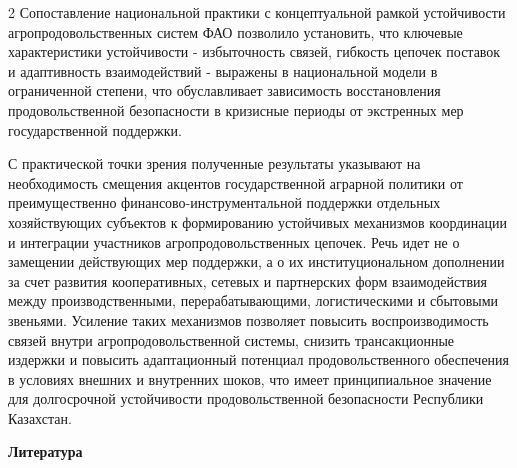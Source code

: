 \begin{multicols}{2}
Сопоставление национальной практики с концептуальной рамкой устойчивости
агропродовольственных систем ФАО позволило установить, что ключевые
характеристики устойчивости - избыточность связей, гибкость цепочек
поставок и адаптивность взаимодействий - выражены в национальной модели
в ограниченной степени, что обуславливает зависимость восстановления
продовольственной безопасности в кризисные периоды от экстренных мер
государственной поддержки.

С практической точки зрения полученные результаты указывают на
необходимость смещения акцентов государственной аграрной политики от
преимущественно финансово-инструментальной поддержки отдельных
хозяйствующих субъектов к формированию устойчивых механизмов координации
и интеграции участников агропродовольственных цепочек. Речь идет не о
замещении действующих мер поддержки, а о их институциональном дополнении
за счет развития кооперативных, сетевых и партнерских форм
взаимодействия между производственными, перерабатывающими,
логистическими и сбытовыми звеньями. Усиление таких механизмов позволяет
повысить воспроизводимость связей внутри агропродовольственной системы,
снизить трансакционные издержки и повысить адаптационный потенциал
продовольственного обеспечения в условиях внешних и внутренних шоков,
что имеет принципиальное значение для долгосрочной устойчивости
продовольственной безопасности Республики Казахстан.
\end{multicols}

\begin{center}
{\bfseries Литература}
\end{center}

